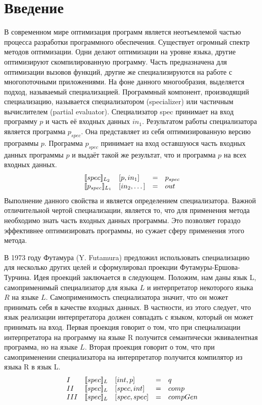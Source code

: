 \documentclass{spbau-diploma}
\begin{document}
\maketitle

\tableofcontents

\section*{Введение}
В современном мире оптимизация программ является неотъемлемой частью процесса разработки программного обеспечения. Существует огромный спектр методов оптимизации. Одни делают оптимизации на уровне языка, другие оптимизируют скомпилированную программу. Часть предназначена для оптимизации вызовов функций, другие же специализируются на работе с многопоточными приложениями. На фоне данного многообразия, выделяется подход, называемый специализацией. Программный компонент, производящий специализацию, называется специализатором (specializer) или частичным вычислителем (partial evaluator). Специализатор spec принимает на вход программу $p$ и часть её входных данных $in_1$. Результатом работы специализатора является программа $p_{spec}$. Она представляет из себя оптимизированную версию программы $p$. Программа $p_{spec}$ принимает на вход оставшуюся часть входных данных программы $p$ и выдаёт такой же результат, что и программа $p$ на всех входных данных. 
$$\begin{array}{l l c l}
        \llbracket spec \rrbracket_{L_2} & [p, in_1] &= &p_{spec}\\
        \llbracket p_{spec} \rrbracket_{L_1} & [in_2 ,\dots] &= &out
      \end{array}$$
Выполнение данного свойства и является определением специализатора. Важной отличительной чертой специализации, является то, что для применения метода необходимо знать часть входных данных программы. Это позволяет гораздо эффективнее оптимизировать программы, но сужает сферу применения этого метода.


В 1973 году Футамура (Y. Futamura) предложил использовать специализацию для несколько других целей и сформулировал проекции Футамуры-Ершова-Турчина. Идея проекций заключается в следующем. Положим, нам даны язык L, самоприменимый специализатор для языка $L$ и интерпретатор некоторого языка $R$ на языке $L$. Самоприменимость специализатора значит, что он может принимать себя в качестве входных данных. В частности, из этого следует, что язык реализации интерпретатора должен совпадать с языком, который он может принимать на вход. Первая проекция говорит о том, что при специализации интерпретатора на программу на языке R получится семантически эквивалентная программа, но на языке $L$. Вторая проекция говорит о том, что при самоприменении специализатора на интерпретатор получится компилятор из языка R в язык L.
    $$
    \begin{array}{l l l c l}
      I & \llbracket spec \rrbracket_L &[int, p] &= &q\\
      II & \llbracket spec \rrbracket_L &[spec, int] &= &comp\\
      III & \llbracket spec \rrbracket_L &[spec, spec] &= &compGen
    \end{array}$$  
\end{document}
